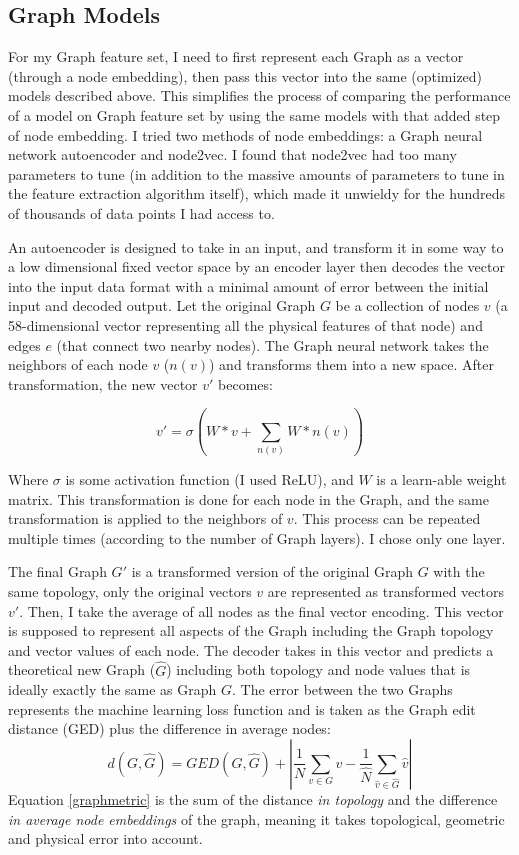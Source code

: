 \documentclass[defaultstyle,11pt]{thesis}
\begin{document}
\subsection{Graph Models}
For my Graph feature set, I need to first represent each Graph as a vector (through a node embedding), then pass this vector into the same (optimized) models described above. This simplifies the process of comparing the performance of a model on Graph feature set by using the same models with that added step of node embedding. I tried two methods of node embeddings: a Graph neural network autoencoder and node2vec. I found that node2vec had too many parameters to tune (in addition to the massive amounts of parameters to tune in the feature extraction algorithm itself), which made it unwieldy for the hundreds of thousands of data points I had access to.

An autoencoder is designed to take in an input, and transform it in some way to a low dimensional fixed vector space by an encoder layer then decodes the vector into the input data format with a minimal amount of error between the initial input and decoded output. Let the original Graph $G$ be a collection of nodes $v$ (a 58-dimensional vector representing all the physical features of that node) and edges $e$ (that connect two nearby nodes).  The Graph neural network takes the neighbors of each node $v$ ($n(v)$) and  transforms them into a new space. After transformation, the new vector $v\prime$ becomes:

$$v'= \sigma (W*v + \sum_{n(v)} W*n(v))$$ 

Where $\sigma$ is some activation function (I used ReLU), and $W$ is a  learn-able weight matrix. This transformation is done for each node in the Graph, and the same transformation is applied to the neighbors of $v$. This process can be repeated multiple times (according to the number of Graph layers). I chose only one layer. 

The final Graph $G'$ is a transformed version of the original Graph $G$ with the same topology, only the original vectors $v$ are represented as transformed vectors $v'$. Then, I take the average of all nodes as the final vector encoding. This vector is supposed to represent all aspects of the Graph including the Graph topology and vector values of each node. The decoder takes in this vector and predicts a theoretical new Graph ($\hat{G}$) including both topology and node values that is ideally exactly the same as Graph $G$. The error between the two Graphs represents the machine learning loss function and is taken as the Graph edit distance (GED) plus the difference in average nodes:
\begin{equation}
    d(G, \hat{G}) = GED(G, \hat{G}) + |\frac{1}{N}\sum_{v \in G}v - \frac{1}{\hat{N}}\sum_{\hat{v} \in \hat{G}}\hat{v}|
    \label{graphmetric}
\end{equation}
Equation \ref{graphmetric} is the sum of the distance \textit{in topology} and the difference \textit{in average node embeddings} of the graph, meaning it takes topological, geometric and physical error into account.
\end{document}
